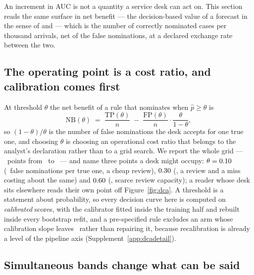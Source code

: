 \documentclass[11pt,3p,review,authoryear]{elsarticle}
\theoremstyle{definition}
\begin{document}
An increment in AUC is not a quantity a service desk can act on. This section
reads the same surface in net benefit --- the decision-based value of a
forecast in the sense of \citet{murphy1993good} and
\citet{granger2000economic} --- which is the number of correctly nominated
cases per thousand arrivals, net of the false nominations, at a declared
exchange rate between the two.

\subsection{The operating point is a cost ratio, and calibration comes first}
\label{sec:calibfirst}

At threshold $\theta$ the net benefit of a rule that nominates when
$\hat p \geq \theta$ is
\[
\mathrm{NB}(\theta) \;=\; \frac{\mathrm{TP}(\theta)}{n}
\;-\; \frac{\mathrm{FP}(\theta)}{n}\cdot\frac{\theta}{1-\theta},
\]
so $(1-\theta)/\theta$ is the number of false nominations the desk accepts
for one true one, and choosing $\theta$ is choosing an operational cost ratio
that belongs to the analyst's declaration rather than to a grid search. We
report the whole grid --- \nGrid\ points from \gridLo\ to \gridHi\ --- and
name three points a desk might occupy: $\theta = 0.10$ (\ratioCheap\
false nominations per true one, a cheap review), $0.30$ (\ratioBase, a
review and a miss costing about the same) and $0.60$ (\ratioDear,
scarce review capacity); a reader whose desk sits elsewhere reads their own
point off Figure~\ref{fig:dca}. A threshold is a statement about
probability, so every decision curve here is computed on \emph{calibrated}
scores, with the calibrator fitted inside the training half and rebuilt
inside every bootstrap refit, and a pre-specified rule excludes an arm whose
calibration slope leaves \calSlopeWindow\ rather than repairing it, because
recalibration is already a level of the pipeline axis
(Supplement~\ref{app:dcadetail}).

\subsection{Simultaneous bands change what can be said}
\label{sec:dcabands}
\end{document}
